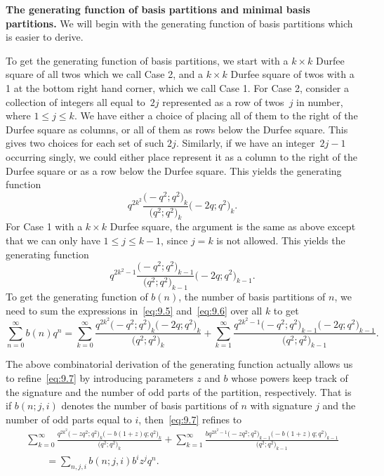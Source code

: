 \documentclass[10pt,a4paper]{amsart}
\numberwithin{equation}{section}
\theoremstyle{definition}
\begin{document}
{\bf The generating function of basis partitions and minimal basis
partitions.}
We will begin with the generating function of basis partitions which is
easier to derive.

To get the generating function of basis partitions,
we start with a $k\times k$ Durfee square of all twos which we call Case 2,
and a $k\times k$ Durfee square of twos with a 1 at the bottom right hand
corner, which we call Case 1. For Case 2, consider a collection of integers
all equal to~$2j$ represented as a row of twos~$j$ in number,
where $1\le j\le k$. We have
either a choice of placing all of them to the right of the Durfee square as
columns, or all of them as rows below the Durfee square. This gives two choices
for each set of such $2j$. Similarly, if we have an integer~${2j-1}$ occurring
singly, we could either place represent it as a column to the right of the
Durfee square or as a row below the Durfee square. This yields the generating
function
\begin{equation}
q^{2k^2}\frac{\bigl(-q^2;q^2\bigr)_k}{\bigl(q^2;q^2\bigr)_k} \bigl(-2q;q^2\bigr)_k.\label{eq:9.5}
\end{equation}
For Case 1 with a $k\times k$ Durfee square, the argument is the same as above
except that we can only have $1\le j\le k-1$, since $j=k$ is not allowed. This
yields the generating function
\begin{equation}
q^{2k^2-1}\frac{\bigl(-q^2;q^2\bigr)_{k-1}}{\bigl(q^2;q^2\bigr)_{k-1}} \bigl(-2q;q^2\bigr)_{k-1}.\label{eq:9.6}
\end{equation}
To get the generating function of $b(n)$, the number of basis partitions of
$n$, we need to sum the expressions in~\eqref{eq:9.5} and~\eqref{eq:9.6} over all $k$ to get
\begin{equation}
\sum^{\infty}_{n=0}b(n)q^n=
\sum^{\infty}_{k=0}\frac{q^{2k^2}\bigl(-q^2;q^2\bigr)_k\bigl(-2q;q^2\bigr)_k}{\bigl(q^2;q^2\bigr)_k}
+\sum^{\infty}_{k=1}\frac{q^{2k^2-1}\bigl(-q^2;q^2\bigr)_{k-1}\bigl(-2q;q^2\bigr)_{k-1}}{\bigl(q^2;q^2\bigr)_{k-1}}.
\label{eq:9.7}
\end{equation}

The above combinatorial derivation of the generating function actually allows
us to refine~\eqref{eq:9.7} by introducing parameters $z$ and $b$ whose powers keep
track of the signature and the number of odd parts of the partition,
respectively. That is if $b(n;j,i)$ denotes the number of basis partitions of
$n$ with signature $j$ and the number of odd parts equal to $i$, then~\eqref{eq:9.7}
refines to
\begin{gather}
\sum^{\infty}_{k=0}\frac{q^{2k^2}\bigl(-zq^2;q^2\bigr)_k\bigl(-b(1+z)q;q^2\bigr)_k}{\bigl(q^2;q^2\bigr)_k}
+\sum^{\infty}_{k=1}\frac{bq^{2k^2-1}\bigl(-zq^2;q^2\bigr)_{k-1}\bigl(-b(1+z)q;q^2\bigr)_{k-1}}
{\bigl(q^2;q^2\bigr)_{k-1}}
\nonumber\\
\qquad{}=\sum_{n,j,i}b(n;j,i)b^iz^jq^n.\label{eq:9.8}
\end{gather}
\end{document}
